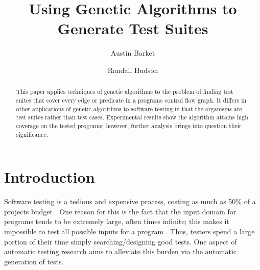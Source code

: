 \documentclass[runningheads]{llncs}
\begin{document}
\pagestyle{headings}
\mainmatter

\title{Using Genetic Algorithms to Generate Test Suites}
\titlerunning{}
\author{Austin Barket \and Randall Hudson}
 \maketitle

\begin{abstract}
This paper applies techniques of genetic algorithms to the problem of finding test suites that cover every edge or predicate in a programs control flow graph. It differs in other applications of genetic algorithms to software testing in that the organisms are test suites rather than test cases. Experimental results show the algorithm attains high coverage on the tested programs; however, further analysis brings into question their significance.
\end{abstract}

\begin{comment}
\section{TODO}
\begin{itemize}
\item Add any missing citations
\item Conclusion Section
     \begin{itemize}
     \item Concluding remarks
     \item Future work
     \end{itemize}
\item Read over the copy and pasted sections from proposal to make sure it all makes sense in this new context.
\item General: find any thing that needs reworded, pruned, etc and fix.
\end{itemize}
\end{comment}

\section{Introduction}
Software testing is a tedious and expensive process, costing as much as 50\% of a projects budget \cite{meyers1}. One reason for this is the fact that the input domain for programs tends to be extremely large, often times infinite; this makes it impossible to test all possible inputs for a program \cite{meyers1}. Thus, testers spend a large portion of their time simply searching/designing good tests. One aspect of automatic testing research aims to alleviate this burden via the automatic generation of tests.
\end{document}
